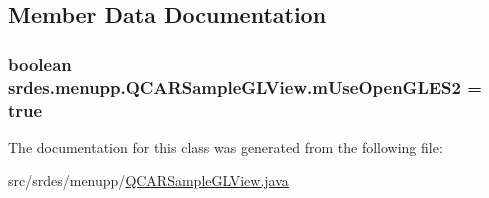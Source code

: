 \subsection{\-Member \-Data \-Documentation}
\hypertarget{classsrdes_1_1menupp_1_1_q_c_a_r_sample_g_l_view_acc6eb07cc52fc3f8be4ed9d192dabce6}{
\subsubsection[{m\-Use\-Open\-G\-L\-E\-S2}]{\setlength{\rightskip}{0pt plus 5cm}boolean {\bf srdes.\-menupp.\-Q\-C\-A\-R\-Sample\-G\-L\-View.\-m\-Use\-Open\-G\-L\-E\-S2} = true}}\label{classsrdes_1_1menupp_1_1_q_c_a_r_sample_g_l_view_acc6eb07cc52fc3f8be4ed9d192dabce6}


\-The documentation for this class was generated from the following file\-:\begin{DoxyCompactItemize}
\item 
src/srdes/menupp/\hyperlink{_q_c_a_r_sample_g_l_view_8java}{\-Q\-C\-A\-R\-Sample\-G\-L\-View.\-java}\end{DoxyCompactItemize}
